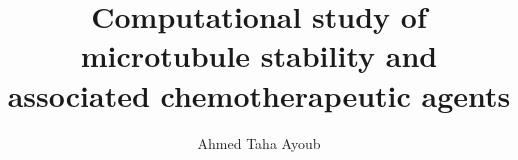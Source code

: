 \documentclass[11pt]{report}
\begin{document}

%
%
%
%
%
%
%
%
%
%
%
%
%
%
%
%
%
%
%
%
%
%
%
%
%
%
%
%
%
%
%
%
%
%
%
%
%
%
%
\title{Computational study of microtubule stability and associated chemotherapeutic agents}
\author{Ahmed Taha Ayoub}%
%
%
%
%
%
%
%
%
%
%
%
%
%
%
%
%
%
%
%
%
%
%
%
%
%
%
%
%
%
%
%
%
%
%
%
%
%
%
%

\admin  	%
%
%
%
%
%
%
%
%
%
%
%
%
%
%
%
%
%
%
%
%
%
%
%
%
%
%
%
%
%
%
%
%
%
%
%
%
%
%
%
%
\dedicationpage
\doublespacing		%
\end{document}
